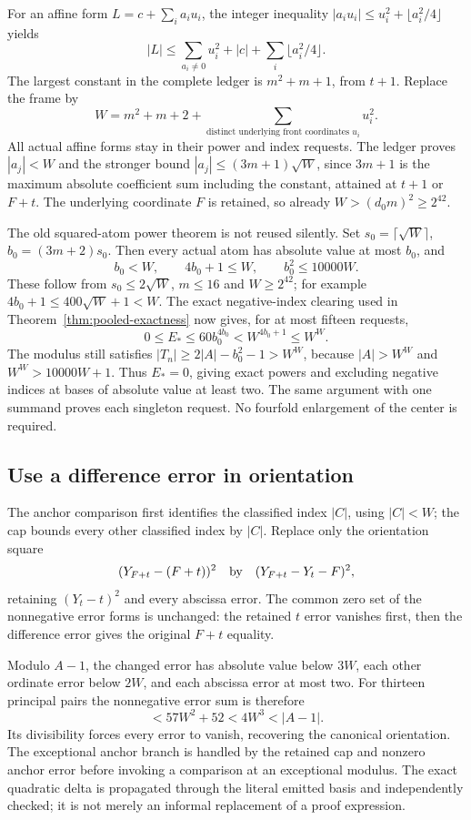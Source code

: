 For an affine form $L=c+\sum_ia_iu_i$, the integer inequality
$|a_iu_i|\le u_i^2+\lfloor a_i^2/4\rfloor$ yields
\[
 |L|\le\sum_{a_i\ne0}u_i^2+|c|+\sum_i\lfloor a_i^2/4\rfloor.
\]
The largest constant in the complete ledger is $m^2+m+1$, from $t+1$.
Replace the frame by
\begin{equation}\label{eq:compressed-frame}
 W=m^2+m+2+\sum_{\text{distinct underlying front coordinates }u_i}u_i^2.
\end{equation}
All actual affine forms stay in their power and index requests. The ledger
proves $|a_j|<W$ and the stronger bound
$|a_j|\le(3m+1)\sqrt W$, since $3m+1$ is the maximum absolute coefficient
sum including the constant, attained at $t+1$ or $F+t$. The underlying
coordinate $F$ is retained, so already $W>(d_0m)^2\ge2^{42}$.

The old squared-atom power theorem is not reused silently. Set
$s_0=\lceil\sqrt W\rceil$, $b_0=(3m+2)s_0$. Then every actual atom has
absolute value at most $b_0$, and
\[
 b_0<W,\qquad4b_0+1\le W,\qquad b_0^2\le10000W.
\]
These follow from $s_0\le2\sqrt W$, $m\le16$ and $W\ge2^{42}$;
for example $4b_0+1\le400\sqrt W+1<W$.
The exact negative-index clearing used in Theorem~\ref{thm:pooled-exactness}
now gives, for at most fifteen requests,
\[
 0\le E_*\le60b_0^{4b_0}<W^{4b_0+1}\le W^W.
\]
The modulus still satisfies
$|T_n|\ge2|A|-b_0^2-1>W^W$, because $|A|>W^W$ and
$W^W>10000W+1$. Thus $E_*=0$, giving exact powers and excluding negative
indices at bases of absolute value at least two. The same argument with one summand proves each
singleton request. No fourfold enlargement of the center is required.

\subsection{Use a difference error in orientation}
The anchor comparison first identifies the classified index $|C|$, using
$|C|<W$; the cap bounds every other classified index by $|C|$.
Replace only the orientation square
\[
 (Y_{F+t}-(F+t))^2
 \quad\hbox{by}\quad (Y_{F+t}-Y_t-F)^2,
\]
retaining $(Y_t-t)^2$ and every abscissa error. The common zero set of the
nonnegative error forms is unchanged: the retained $t$ error vanishes first,
then the difference error gives the original $F+t$ equality.

Modulo $A-1$, the changed error has absolute value below $3W$, each other
ordinate error below $2W$, and each abscissa error at most two. For thirteen
principal pairs the nonnegative error sum is therefore
\[
 <57W^2+52<4W^3<|A-1|.
\]
Its divisibility forces every error to vanish, recovering the canonical
orientation. The exceptional anchor branch is handled by the retained cap
and nonzero anchor error before invoking a comparison at an exceptional
modulus. The exact quadratic delta is propagated through the literal emitted
basis and independently checked; it is not merely an informal replacement
of a proof expression.

